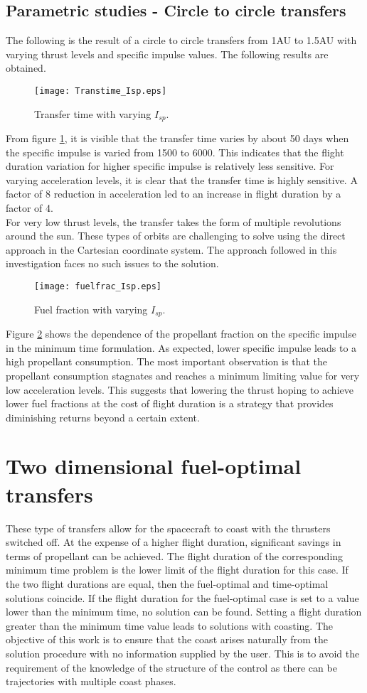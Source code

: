 \subsection{Parametric studies - Circle to circle transfers}
The following is the result of a circle to circle transfers from 1AU to 1.5AU with varying thrust levels and specific impulse values. The following results are obtained.
\begin{figure}[H]
	\centering\texttt{[image: Transtime\_Isp.eps]}
	\caption{Transfer time with varying $I_{sp}$.}
	\label{transtime_isp}
\end{figure}
From figure \ref{transtime_isp}, it is visible that the transfer time varies by about 50 days when the specific impulse is varied from 1500 to 6000. This indicates that the flight duration variation for higher specific impulse is relatively less sensitive. For varying acceleration levels, it is clear that the transfer time is highly sensitive. A factor of 8 reduction in acceleration led to an increase in flight duration by a factor of 4.\\
For very low thrust levels, the transfer takes the form of multiple revolutions around  the sun. These types of orbits are challenging to solve using the direct approach in the Cartesian coordinate system. The approach followed in this investigation faces no such issues to the solution.
\begin{figure}[H]
	\centering\texttt{[image: fuelfrac\_Isp.eps]}
	\caption{Fuel fraction with varying $I_{sp}$.}
	\label{fuelfrac_isp}
\end{figure}
Figure \ref{fuelfrac_isp} shows the dependence of the propellant fraction on the specific impulse in the minimum time formulation. As expected, lower specific impulse leads to a high propellant consumption. The most important observation is that the propellant consumption stagnates and reaches a minimum limiting value for very low acceleration levels. This suggests that lowering the thrust hoping to achieve lower fuel fractions at the cost of flight duration is a strategy that provides diminishing returns beyond a certain extent. 
\section{Two dimensional fuel-optimal transfers}
These type of transfers allow for the spacecraft to coast with the thrusters switched off. At the expense of a higher flight duration, significant savings in terms of propellant can be achieved. The flight duration of the corresponding minimum time problem is the lower limit of the flight duration for this case. If  the two flight durations are equal, then the fuel-optimal and time-optimal solutions coincide. If the flight duration for the fuel-optimal case is set to a value lower than the minimum time, no solution can be found. Setting a flight duration greater than the minimum time value leads to solutions with coasting. The objective of this work is to ensure that the coast arises naturally from the solution procedure with no information supplied by the user. This is to avoid the requirement of the knowledge of the structure of the control as there can be trajectories with multiple coast phases.\\
